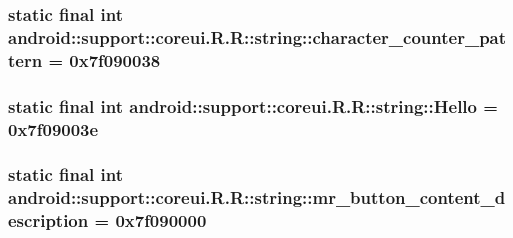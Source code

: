 \hypertarget{classandroid_1_1support_1_1coreui_1_1_r_1_1string_2834d67f3bb85ecf8c7b606f9b22c630}{
\subsubsection[{character\_\-counter\_\-pattern}]{\setlength{\rightskip}{0pt plus 5cm}static final int android::support::coreui.R.R::string::character\_\-counter\_\-pattern = 0x7f090038}}
\label{classandroid_1_1support_1_1coreui_1_1_r_1_1string_2834d67f3bb85ecf8c7b606f9b22c630}


\hypertarget{classandroid_1_1support_1_1coreui_1_1_r_1_1string_b077e258a15fa410a4b5e510c6bb945e}{
\subsubsection[{Hello}]{\setlength{\rightskip}{0pt plus 5cm}static final int android::support::coreui.R.R::string::Hello = 0x7f09003e}}
\label{classandroid_1_1support_1_1coreui_1_1_r_1_1string_b077e258a15fa410a4b5e510c6bb945e}


\hypertarget{classandroid_1_1support_1_1coreui_1_1_r_1_1string_dd86309a68b8f0f41fe95ceffab99151}{
\subsubsection[{mr\_\-button\_\-content\_\-description}]{\setlength{\rightskip}{0pt plus 5cm}static final int android::support::coreui.R.R::string::mr\_\-button\_\-content\_\-description = 0x7f090000}}
\label{classandroid_1_1support_1_1coreui_1_1_r_1_1string_dd86309a68b8f0f41fe95ceffab99151}


